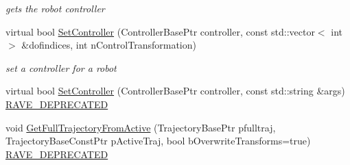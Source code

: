 \begin{DoxyCompactItemize}
\begin{DoxyCompactList}\small\item\em gets the robot controller \item\end{DoxyCompactList}\item 
virtual bool \hyperlink{classOpenRAVE_1_1RobotBase_a8384a87dcfccbd3b27006c1769219c28}{SetController} (ControllerBasePtr controller, const std::vector$<$ int $>$ \&dofindices, int nControlTransformation)
\begin{DoxyCompactList}\small\item\em set a controller for a robot \item\end{DoxyCompactList}\item 
virtual bool \hyperlink{classOpenRAVE_1_1RobotBase_a4d4d9910820087bb1a0d916ca1bb0e5c}{SetController} (ControllerBasePtr controller, const std::string \&args) \hyperlink{classOpenRAVE_1_1RobotBase_ad7131b2e388f7f953e9cc14f7336c8e2}{RAVE\_\-DEPRECATED}
\item 
void \hyperlink{classOpenRAVE_1_1RobotBase_a84070a927466aa5da331649c94b5e854}{GetFullTrajectoryFromActive} (TrajectoryBasePtr pfulltraj, TrajectoryBaseConstPtr pActiveTraj, bool bOverwriteTransforms=true) \hyperlink{classOpenRAVE_1_1RobotBase_ad7131b2e388f7f953e9cc14f7336c8e2}{RAVE\_\-DEPRECATED}
\end{DoxyCompactItemize}
